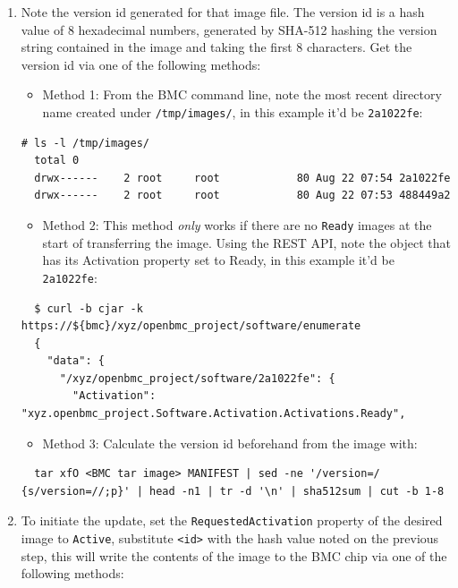 \begin{enumerate}
  Methods 3 and 4 require additional options in bmcweb to be enabled.
\item
  Note the version id generated for that image file. The version id is a
  hash value of 8 hexadecimal numbers, generated by SHA-512 hashing the
  version string contained in the image and taking the first 8
  characters. Get the version id via one of the following methods:

  \begin{itemize}
  \tightlist
  \item
    Method 1: From the BMC command line, note the most recent directory
    name created under \texttt{/tmp/images/}, in this example it'd be
    \texttt{2a1022fe}:
  \end{itemize}

\begin{verbatim}
# ls -l /tmp/images/
  total 0
  drwx------    2 root     root            80 Aug 22 07:54 2a1022fe
  drwx------    2 root     root            80 Aug 22 07:53 488449a2
\end{verbatim}

  \begin{itemize}
  \tightlist
  \item
    Method 2: This method \emph{only} works if there are no
    \texttt{Ready} images at the start of transferring the image. Using
    the REST API, note the object that has its Activation property set
    to Ready, in this example it'd be \texttt{2a1022fe}:
  \end{itemize}

\begin{verbatim}
  $ curl -b cjar -k https://${bmc}/xyz/openbmc_project/software/enumerate
  {
    "data": {
      "/xyz/openbmc_project/software/2a1022fe": {
        "Activation": "xyz.openbmc_project.Software.Activation.Activations.Ready",
\end{verbatim}

  \begin{itemize}
  \tightlist
  \item
    Method 3: Calculate the version id beforehand from the image with:
  \end{itemize}

\begin{verbatim}
  tar xfO <BMC tar image> MANIFEST | sed -ne '/version=/ {s/version=//;p}' | head -n1 | tr -d '\n' | sha512sum | cut -b 1-8
\end{verbatim}
\item
  To initiate the update, set the \texttt{RequestedActivation} property
  of the desired image to \texttt{Active}, substitute
  \texttt{\textless{}id\textgreater{}} with the hash value noted on the
  previous step, this will write the contents of the image to the BMC
  chip via one of the following methods:


\end{enumerate}
